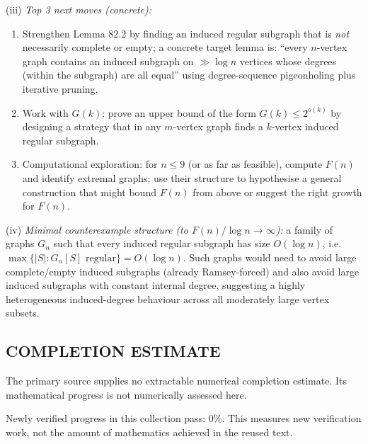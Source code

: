 (iii) \emph{Top 3 next moves (concrete):}
\begin{enumerate}
\item Strengthen Lemma 82.2 by finding an induced regular subgraph that is \emph{not} necessarily complete or empty; a concrete target lemma is: ``every $n$-vertex graph contains an induced subgraph on $\gg \log n$ vertices whose degrees (within the subgraph) are all equal'' using degree-sequence pigeonholing plus iterative pruning.
\item Work with $G(k)$: prove an upper bound of the form $G(k)\le 2^{o(k)}$ by designing a strategy that in any $m$-vertex graph finds a $k$-vertex induced regular subgraph.
\item Computational exploration: for $n\le 9$ (or as far as feasible), compute $F(n)$ and identify extremal graphs; use their structure to hypothesise a general construction that might bound $F(n)$ from above or suggest the right growth for $F(n)$.
\end{enumerate}

(iv) \emph{Minimal counterexample structure (to $F(n)/\log n\to\infty$):} a family of graphs $G_n$ such that every induced regular subgraph has size $O(\log n)$, i.e. $\max\{|S|:G_n[S]\text{ regular}\}=O(\log n)$. Such graphs would need to avoid large complete/empty induced subgraphs (already Ramsey-forced) and also avoid large induced subgraphs with constant internal degree, suggesting a highly heterogeneous induced-degree behaviour across all moderately large vertex subsets.



\subsection*{COMPLETION ESTIMATE}
The primary source supplies no extractable numerical completion estimate. Its mathematical progress is not numerically assessed here.

Newly verified progress in this collection pass: $0\%$. This measures new verification work, not the amount of mathematics achieved in the reused text.

